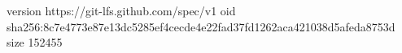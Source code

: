 version https://git-lfs.github.com/spec/v1
oid sha256:8c7e4773e87e13dc5285ef4cecde4e22fad37fd1262aca421038d5afeda8753d
size 152455
